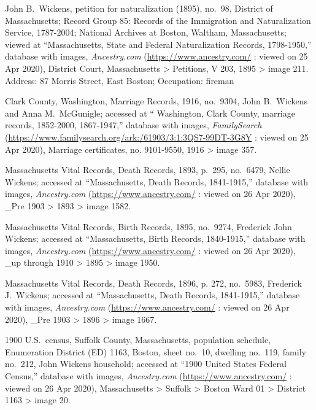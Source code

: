 \begin{thebibliography}{999}
	John B.\ Wickens, petition for naturalization (1895), no.\ 98, District of Massachusetts; Record Group 85: Records of the Immigration and Naturalization Service, 1787-2004; National Archives at Boston, Waltham, Massachusetts; viewed at ``Massachusetts, State and Federal Naturalization Records, 1798-1950,'' database with images, \textit{Ancestry.com} (\url{https://www.ancestry.com/} : viewed on 25 Apr 2020), District Court, Massachusetts > Petitions, V 203, 1895 > image 211.\\
	Address: 87 Morris Street, East Boston; Occupation: fireman
	
	Clark County, Washington, Marriage Records, 1916, no.\ 9304, John B.\ Wickens and Anna M.\ McGunigle; accessed at `` Washington, Clark County, marriage records, 1852-2000, 1867-1947,'' database with images, \textit{FamilySearch} (\url{https://www.familysearch.org/ark:/61903/3:1:3QS7-99DT-3G8Y} : viewed on 25 Apr 2020), Marriage certificates, no. 9101-9550, 1916 > image 357.
	
	Massachusetts Vital Records, Death Records, 1893, p.\ 295, no.\ 6479, Nellie Wickens; accessed at ``Massachusetts, Death Records, 1841-1915,'' database with images, \textit{Ancestry.com} (\url{https://www.ancestry.com/} : viewed on 26 Apr 2020), \_Pre 1903 > 1893 > image 1582.
	
	Massachusetts Vital Records, Birth Records, 1895, no.\ 9274, Frederick John Wickens; accessed at ``Massachusetts, Birth Records, 1840-1915,'' database with images, \textit{Ancestry.com} (\url{https://www.ancestry.com/} : viewed on 26 Apr 2020), \_up through 1910 > 1895 > image 1950.
	
	Massachusetts Vital Records, Death Records, 1896, p. 272, no.\ 5983, Frederick J.\ Wickens; accessed at ``Massachusetts, Death Records, 1841-1915,'' database with images, \textit{Ancestry.com} (\url{https://www.ancestry.com/} : viewed on 26 Apr 2020), \_Pre 1903 > 1896 > image 1667.
	
	1900 U.S.\ census, Suffolk County, Massachusetts, population schedule, Enumeration District (ED) 1163,  Boston, sheet no.\ 10, dwelling no.\ 119, family no.\ 212, John Wickens household; accessed at ``1900 United States Federal Census,'' database with images, \textit{Ancestry.com} (\url{https://www.ancestry.com/} : viewed on 26 Apr 2020), Massachusetts > Suffolk > Boston Ward 01 > District 1163 > image 20.
	

\end{thebibliography}
